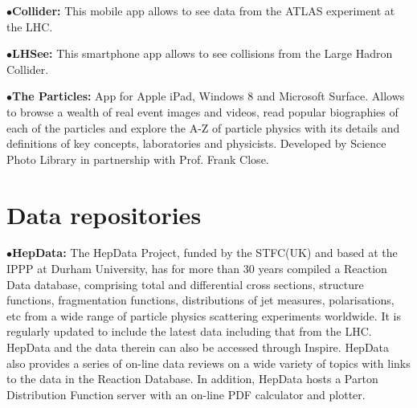 \medskip

\item{$\bullet$}{\bf Collider:}
This mobile app allows to see data from the ATLAS experiment at the LHC.
	\item{}

\medskip

\item{$\bullet$}{\bf LHSee:}
This smartphone app allows to see collisions from the Large Hadron Collider.
	\item{}

\medskip

\item{$\bullet$}{\bf The Particles:}
App for Apple iPad, Windows 8 and Microsoft Surface.  Allows to browse a wealth of real event images and videos, read popular biographies of each of the particles and explore the A-Z of particle physics with its details and definitions of key concepts, laboratories and physicists. Developed by Science Photo Library in partnership with Prof. Frank Close.
	\item{}

\medskip

\section{Data repositories}  %

\medskip


\medskip


\item{$\bullet$}{\bf HepData:} 
The HepData Project, funded by the STFC(UK) and based at the IPPP at Durham University, has for more than 30 years compiled a Reaction Data database, comprising total and differential cross sections, structure functions, fragmentation functions, distributions of jet measures, polarisations, etc from a wide range of particle physics scattering experiments worldwide. It is regularly updated to include the latest data including that from the LHC. HepData and the data therein can also be accessed through Inspire. HepData also provides a series of on-line data reviews on a wide variety of topics with links to the data in the Reaction Database. In addition, HepData hosts a Parton Distribution Function server with an on-line PDF calculator and plotter.
	\item{}

